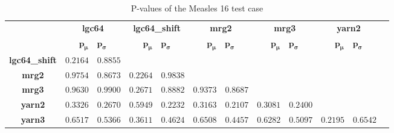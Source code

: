 \documentclass{acmart}
\begin{document}
\begin{table}[!hbt]
    \begin{tabular}{c|c|c|c|c|c|c}
        & \textbf{lgc64} & \textbf{lgc64\_shift} & \textbf{mrg2} & \textbf{mrg3} & \textbf{yarn2} \\
        &  \( \bm{p_\mu} \quad \bm{p_\sigma} \)
            &  \( \bm{p_\mu} \quad \bm{p_\sigma} \)
            &  \( \bm{p_\mu} \quad \bm{p_\sigma} \)
            &  \( \bm{p_\mu} \quad \bm{p_\sigma} \)
            &  \( \bm{p_\mu} \quad \bm{p_\sigma} \) \\
        \textbf{lgc64\_shift}
            & \( 0.2164 \quad 0.8855 \)
            & \cellcolor{gray}
            & \cellcolor{gray}
            & \cellcolor{gray}
            & \cellcolor{gray} \\
        \textbf{mrg2}      
            & \( 0.9754 \quad 0.8673 \) 
            & \( 0.2264 \quad 0.9838 \) 
            & \cellcolor{gray}
            & \cellcolor{gray}
            & \cellcolor{gray} \\
        \textbf{mrg3}          
            & \( 0.9630 \quad 0.9900 \)
            & \( 0.2671 \quad 0.8882 \) 
            & \( 0.9373 \quad 0.8687 \) 
            & \cellcolor{gray}
            & \cellcolor{gray} \\
        \textbf{yarn2}        
            & \( 0.3326 \quad 0.2670 \)  
            & \( 0.5949 \quad 0.2232 \)  
            & \( 0.3163 \quad 0.2107 \) 
            & \( 0.3081 \quad 0.2400 \)  
            & \cellcolor{gray} \\
        \textbf{yarn3}          
            & \( 0.6517 \quad 0.5366 \)  
            & \( 0.3611 \quad 0.4624 \) 
            & \( 0.6508 \quad 0.4457 \)
            & \( 0.6282 \quad 0.5097 \) 
            & \( 0.2195 \quad 0.6542 \) \\
    \end{tabular}
    \caption{P-values of the Measles 16 test case}
    \label{tab:measles_16:p_values}
\end{table}

\clearpage
\end{document}
